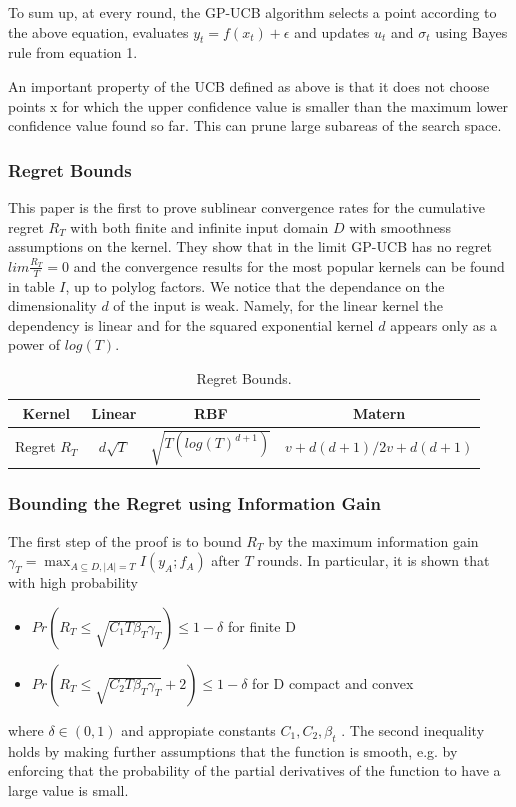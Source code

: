 \documentclass[10pt,journal,a4paper]{IEEEtran}
\begin{document}
To sum up, at every round, the GP-UCB algorithm selects a point according to the above equation, evaluates $y_t=f(x_t) + \epsilon$ and updates $u_t$ and $\sigma_t$ using Bayes rule from equation 1.

An important property of the UCB defined as above is that it does not choose points x for which the upper confidence value is smaller than the maximum lower confidence value found so far. This can prune large subareas of the search space.

\subsubsection{Regret Bounds}

This paper is the first to prove sublinear convergence rates for the cumulative regret $R_T$ with both finite and infinite input domain $D$ with smoothness assumptions on the kernel. They show that in the limit GP-UCB has no regret $lim \frac{R_T}{T}= 0$ and the convergence results for the most popular kernels can be found in table $I$, up to polylog factors. We notice that the dependance on the dimensionality $d$ of the input is weak. Namely, for the linear kernel the dependency is linear and for the squared exponential kernel $d$ appears only as a power of $log(T)$.
\begin{table}
\begin{tabular}{|c||c|c|c|}
\hline
Kernel & Linear & RBF & Matern\\
\hline
Regret $R_T$ & $d\sqrt{T}$& $\sqrt{T(log(T)^{d+1})} $ &${v+d(d+1)/2v+d(d+1)}$\\
\hline
\end{tabular}
\label{bounds}
\caption{Regret Bounds.}
\end{table}


\subsubsection{Bounding the Regret using Information Gain}
The first step of the proof is to bound $R_T$ by the maximum information gain $\gamma_T = \max_{A \subseteq D, |A| = T} I(y_A;f_A)$ after $T$ rounds.
In particular, it is shown that with high probability
\begin{itemize}
\item $Pr(R_T \leq \sqrt{C_1T\beta_T\gamma_T}) \leq 1- \delta$ for finite D
\item$Pr(R_T \leq \sqrt{C_2T\beta_T\gamma_T} + 2) \leq 1- \delta$ for  D compact and convex 
\end{itemize}
where $\delta \in (0,1)$ and appropiate constants $C_1, C_2, \beta_t$ . The second inequality holds by making further assumptions that the function is smooth, e.g. by enforcing that the probability of the partial derivatives of the function to have a large value is small.
\end{document}
